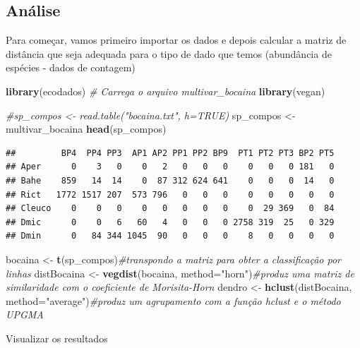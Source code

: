 \documentclass[
]{book}
\newenvironment{Shaded}{\begin{snugshade}}{\end{snugshade}}
\newcommand{\CommentTok}[1]{\textcolor[rgb]{0.56,0.35,0.01}{\textit{#1}}}
\newcommand{\DataTypeTok}[1]{\textcolor[rgb]{0.13,0.29,0.53}{#1}}
\newcommand{\KeywordTok}[1]{\textcolor[rgb]{0.13,0.29,0.53}{\textbf{#1}}}
\newcommand{\NormalTok}[1]{#1}
\newcommand{\StringTok}[1]{\textcolor[rgb]{0.31,0.60,0.02}{#1}}
\begin{document}
\hypertarget{anuxe1lise}{%
\subsection{Análise}\label{anuxe1lise}}

Para começar, vamos primeiro importar os dados e depois calcular a matriz de distância que seja adequada para o tipo de dado que temos (abundância de espécies - dados de contagem)

\begin{Shaded}
\begin{Highlighting}[]
\KeywordTok{library}\NormalTok{(ecodados) }\CommentTok{# Carrega o arquivo multivar_bocaina}
\KeywordTok{library}\NormalTok{(vegan)}


\CommentTok{#sp_compos <- read.table("bocaina.txt", h=TRUE)}
\NormalTok{sp_compos  <-}\StringTok{ }\NormalTok{multivar_bocaina}
\KeywordTok{head}\NormalTok{(sp_compos)}
\end{Highlighting}
\end{Shaded}

\begin{verbatim}
##         BP4  PP4 PP3  AP1 AP2 PP1 PP2 BP9  PT1 PT2 PT3 BP2 PT5
## Aper      0    3   0    0   2   0   0   0    0   0   0 181   0
## Bahe    859   14  14    0  87 312 624 641    0   0   0  14   0
## Rict   1772 1517 207  573 796   0   0   0    0   0   0   0   0
## Cleuco    0    0   0    0   0   0   0   0    0  29 369   0  84
## Dmic      0    0   6   60   4   0   0   0 2758 319  25   0 329
## Dmin      0   84 344 1045  90   0   0   0    8   0   0   0   0
\end{verbatim}

\begin{Shaded}
\begin{Highlighting}[]
\NormalTok{bocaina <-}\StringTok{ }\KeywordTok{t}\NormalTok{(sp_compos)}\CommentTok{#transpondo a matriz para obter a classificação por linhas}
\NormalTok{distBocaina <-}\StringTok{ }\KeywordTok{vegdist}\NormalTok{(bocaina, }\DataTypeTok{method=}\StringTok{"horn"}\NormalTok{)}\CommentTok{#produz uma matriz de similaridade com o coeficiente de Morisita-Horn}
\NormalTok{dendro <-}\StringTok{ }\KeywordTok{hclust}\NormalTok{(distBocaina, }\DataTypeTok{method=}\StringTok{"average"}\NormalTok{)}\CommentTok{#produz um agrupamento com a função hclust e o método UPGMA}
\end{Highlighting}
\end{Shaded}

Visualizar os resultados
\end{document}
